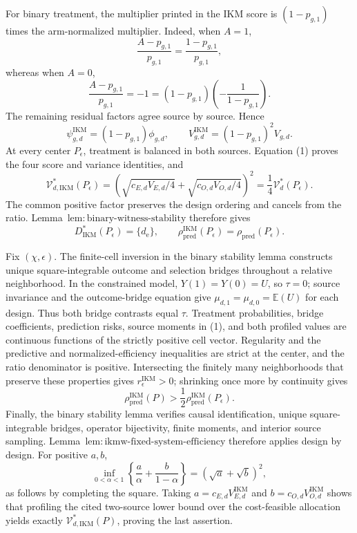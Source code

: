 For binary treatment, the multiplier printed in the IKM score is \((1-p_{g,1})\) times the arm-normalized multiplier. Indeed, when \(A=1\),
\[
 \frac{A-p_{g,1}}{p_{g,1}}=\frac{1-p_{g,1}}{p_{g,1}},
\]
whereas when \(A=0\),
\[
 \frac{A-p_{g,1}}{p_{g,1}}=-1
 =(1-p_{g,1})\left(-\frac1{1-p_{g,1}}\right).
\]
The remaining residual factors agree source by source. Hence
\[
 \psi_{g,d}^{\mathrm{IKM}}=(1-p_{g,1})\phi_{g,d},
 \qquad
 V_{g,d}^{\mathrm{IKM}}=(1-p_{g,1})^2V_{g,d}. \tag{1}
\]
At every center \(P_\epsilon\), treatment is balanced in both sources. Equation (1) proves the four score and variance identities, and
\[
 \mathcal V_{d,\mathrm{IKM}}^*(P_\epsilon)
 =\left(\sqrt{c_{E,d}V_{E,d}/4}
 +\sqrt{c_{O,d}V_{O,d}/4}\right)^2
 =\frac14\mathcal V_d^*(P_\epsilon). \tag{2}
\]
The common positive factor preserves the design ordering and cancels from the ratio. Lemma~\(\mathrm{lem{:}binary\text{-}witness\text{-}stability}\) therefore gives
\[
 D_{\mathrm{IKM}}^*(P_\epsilon)=\{d_{\mathrm e}\},
 \qquad
 \rho_{\mathrm{pred}}^{\mathrm{IKM}}(P_\epsilon)
 =\rho_{\mathrm{pred}}(P_\epsilon). \tag{3}
\]

Fix \((\chi,\epsilon)\). The finite-cell inversion in the binary stability lemma constructs unique square-integrable outcome and selection bridges throughout a relative neighborhood. In the constrained model, \(Y(1)=Y(0)=U\), so \(\tau=0\); source invariance and the outcome-bridge equation give \(\mu_{d,1}=\mu_{d,0}=\mathbb E(U)\) for each design. Thus both bridge contrasts equal \(\tau\). Treatment probabilities, bridge coefficients, prediction risks, source moments in (1), and both profiled values are continuous functions of the strictly positive cell vector. Regularity and the predictive and normalized-efficiency inequalities are strict at the center, and the ratio denominator is positive. Intersecting the finitely many neighborhoods that preserve these properties gives \(r_\epsilon^{\mathrm{IKM}}>0\); shrinking once more by continuity gives
\[
 \rho_{\mathrm{pred}}^{\mathrm{IKM}}(P)
 >\frac12\rho_{\mathrm{pred}}^{\mathrm{IKM}}(P_\epsilon).
\]
Finally, the binary stability lemma verifies causal identification, unique square-integrable bridges, operator bijectivity, finite moments, and interior source sampling. Lemma~\(\mathrm{lem{:}ikmw\text{-}fixed\text{-}system\text{-}efficiency}\) therefore applies design by design. For positive \(a,b\),
\[
 \inf_{0<\alpha<1}\left\{\frac a\alpha+\frac b{1-\alpha}\right\}
 =(\sqrt a+\sqrt b)^2,
\]
as follows by completing the square. Taking \(a=c_{E,d}V_{E,d}^{\mathrm{IKM}}\) and \(b=c_{O,d}V_{O,d}^{\mathrm{IKM}}\) shows that profiling the cited two-source lower bound over the cost-feasible allocation yields exactly \(\mathcal V_{d,\mathrm{IKM}}^*(P)\), proving the last assertion.